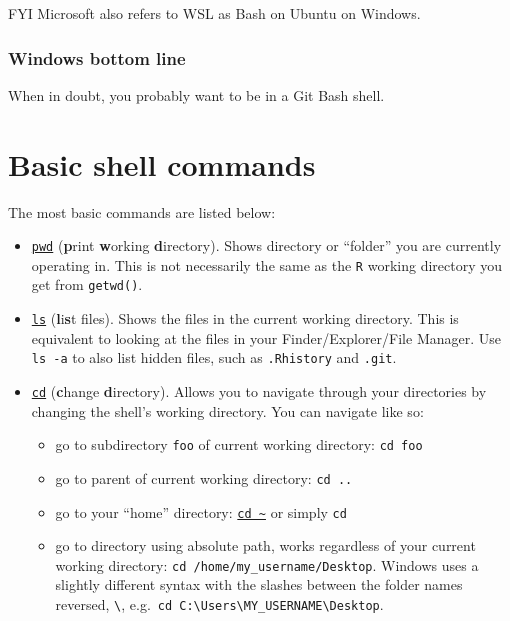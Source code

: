 \documentclass[
]{book}
\providecommand{\tightlist}{%
  \setlength{\itemsep}{0pt}\setlength{\parskip}{0pt}}
\begin{document}
FYI Microsoft also refers to WSL as Bash on Ubuntu on Windows.

\subsubsection{Windows bottom line}\label{windows-bottom-line}

When in doubt, you probably want to be in a Git Bash shell.

\section{Basic shell commands}\label{basic-shell-commands}

The most basic commands are listed below:

\begin{itemize}
\tightlist
\item
  \href{https://en.wikipedia.org/wiki/Pwd}{\texttt{pwd}} (\textbf{p}rint \textbf{w}orking \textbf{d}irectory). Shows directory or ``folder'' you are currently operating in. This is not necessarily the same as the \texttt{R} working directory you get from \texttt{getwd()}.
\item
  \href{https://en.wikipedia.org/wiki/Ls}{\texttt{ls}} (\textbf{l}i\textbf{s}t files). Shows the files in the current working directory. This is equivalent to looking at the files in your Finder/Explorer/File Manager. Use \texttt{ls\ -a} to also list hidden files, such as \texttt{.Rhistory} and \texttt{.git}.
\item
  \href{https://en.wikipedia.org/wiki/Cd_(command)}{\texttt{cd}} (\textbf{c}hange \textbf{d}irectory). Allows you to navigate through your directories by changing the shell's working directory. You can navigate like so:

  \begin{itemize}
  \tightlist
  \item
    go to subdirectory \texttt{foo} of current working directory: \texttt{cd\ foo}
  \item
    go to parent of current working directory: \texttt{cd\ ..}
  \item
    go to your ``home'' directory: \href{http://tilde.club/~ford/tildepoint.jpg}{\texttt{cd\ \textasciitilde{}}} or simply \texttt{cd}
  \item
    go to directory using absolute path, works regardless of your current working directory: \texttt{cd\ /home/my\_username/Desktop}. Windows uses a slightly different syntax with the slashes between the folder names reversed, \texttt{\textbackslash{}}, e.g.~\texttt{cd\ C:\textbackslash{}Users\textbackslash{}MY\_USERNAME\textbackslash{}Desktop}.


\end{itemize}
\end{itemize}
\end{document}
